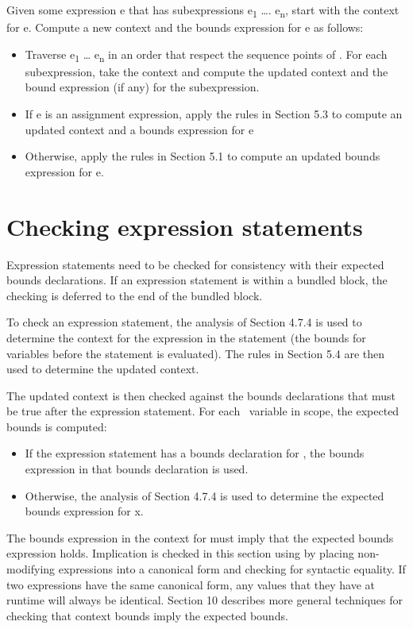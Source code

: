 Given some expression e that has subexpressions e\textsubscript{1}
\ldots{}. e\textsubscript{n}, start with the context for e. Compute a
new context and the bounds expression for e as follows:

\begin{itemize}
\item
  Traverse e\textsubscript{1} \ldots{} e\textsubscript{n} in an order
  that respect the sequence points of \cite{ISO2011}. For each subexpression, take the
  context and compute the updated context and the bound expression (if
  any) for the subexpression.
\item
  If e is an assignment expression, apply the rules in Section 5.3 to
  compute an updated context and a bounds expression for e
\item
  Otherwise, apply the rules in Section 5.1 to compute an updated bounds
  expression for e.
\end{itemize}

 \section{Checking expression statements}\label{checking-expression-statements}

Expression statements need to be checked for consistency with their
expected bounds declarations. If an expression statement is within a
bundled block, the checking is deferred to the end of the bundled block.

To check an expression statement, the analysis of Section 4.7.4 is used
to determine the context for the expression in the statement (the bounds
for variables before the statement is evaluated). The rules in Section
5.4 are then used to determine the updated context.

The updated context is then checked against the bounds declarations that
must be true after the expression statement. For each
\arrayptr\ variable  in scope, the expected bounds is
computed:

\begin{itemize}
\item
  If the expression statement has a bounds declaration for , the
  bounds expression in that bounds declaration is used.
\item
  Otherwise, the analysis of Section 4.7.4 is used to determine the
  expected bounds expression for x.
\end{itemize}

The bounds expression in the context for  must imply that the
expected bounds expression holds. Implication is checked in this section
using by placing non-modifying expressions into a canonical form and
checking for syntactic equality. If two expressions have the same
canonical form, any values that they have at runtime will always be
identical. Section 10 describes more general techniques for checking
that context bounds imply the expected bounds.

